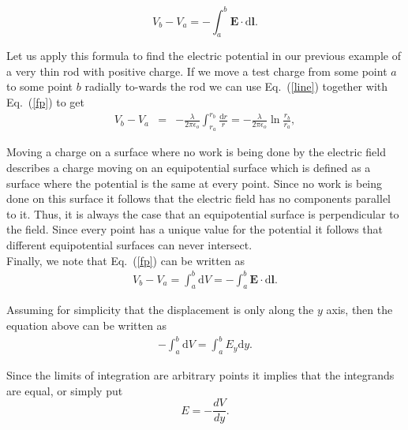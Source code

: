 {\begin{equation}
V_b-V_a=-\int^b_a{\mathbf{E}}\cdot\mathrm{d}{\mathbf{l}}.\label{fp}
\end{equation}

Let us apply this formula to find the electric potential in our
previous example of a very thin rod with positive charge.  If we
move a test charge from some point $a$ to some point $b$ radially
to-wards the rod we can use Eq.~(\ref{line}) together with
Eq.~(\ref{fp}) to get
\begin{eqnarray}
V_b-V_a & = &
-\frac{\lambda}{2\pi\epsilon_o}\int^{r_b}_{r_a}\frac{\mathrm{d}r}{r}
 =
 -\frac{\lambda}{2\pi\epsilon_o}\ln{\frac{r_b}{r_a}},\label{linev}
\end{eqnarray}
\vspace{1.2cm}



\noindent Moving a charge on a surface where no work is being done
by the electric field describes a charge moving on an
equipotential surface which is defined as a surface where the
potential is the same at every point.  Since no work is being done
on this surface it follows that the electric field has no
components parallel to it.  Thus, it is always the case that an
equipotential surface is perpendicular to the field.  Since every
point has a unique value for the potential it follows that
different equipotential surfaces can never intersect.\\


Finally, we note that Eq.~(\ref{fp}) can be written as
\begin{eqnarray*}
V_b-V_a=\int^b_a\mathrm{d}V=-\int^b_a{\mathbf{E}}\cdot\mathrm{d}{\mathbf{l}}.
\end{eqnarray*}

Assuming for simplicity that the displacement is only along the
$y$ axis, then the equation above can be written as
\begin{eqnarray*}
-\int^b_a\mathrm{d}V=\int^b_a E_y\mathrm{d}y.
\end{eqnarray*}

Since the limits of integration are arbitrary points it implies
that the integrands are equal, or simply put
\begin{equation}
E=-\frac{dV}{dy}.\label{efp}
\end{equation}

}
